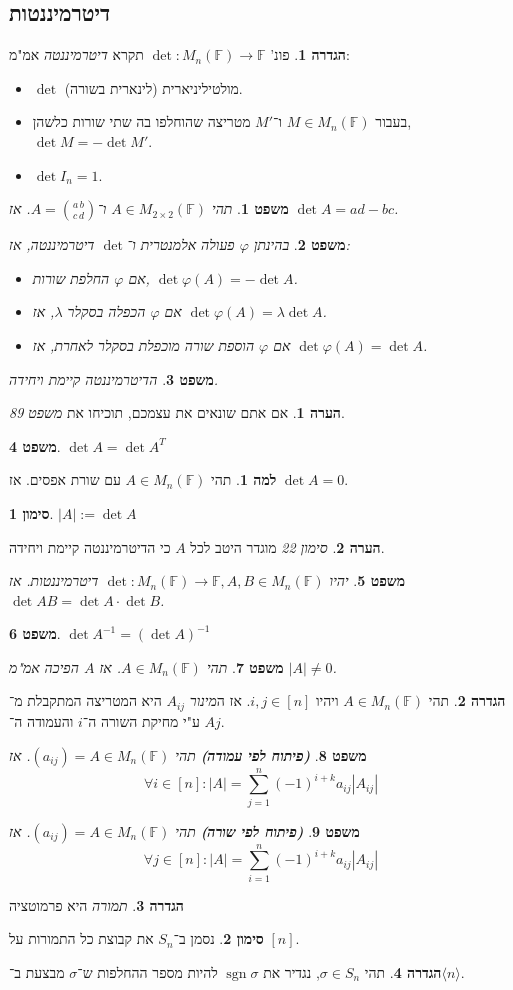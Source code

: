 \documentclass[]{article}
\newcommand\ra    {\rangle}
\newcommand\la    {\langle}
\DeclareMathOperator{\sgn}    {sgn}
\newcommand\F         {\mathbb{F}}
\newcommand\co        {\colon}
\renewcommand\lg      {\lambda}
\newcommand\sg        {\sigma}
\newcommand\op    {^{-1}}
\renewcommand\phi     {\varphi}
\newtheorem{Theorem}{משפט}
\theoremstyle{definition}
\newtheorem{definition}{הגדרה}
\newtheorem{Lemma}{למה}
\newtheorem{Remark}{הערה}
\newtheorem{Notion}{סימון}
\newcommand\theo  [1] {\begin{Theorem}#1\end{Theorem}}
\newcommand\defi  [1] {\begin{definition}#1\end{definition}}
\newcommand\rmark [1] {\begin{Remark}#1\end{Remark}}
\newcommand\lem   [1] {\begin{Lemma}#1\end{Lemma}}
\newcommand\noti  [1] {\begin{Notion}#1\end{Notion}}
\begin{document}
\begin{multicols}{2}
		\section{דיטרמיננטות}
		\defi{פונ' $\det \co M_n(\F) \to \F$ תקרא \textit{דיטרמיננטה} אמ"מ: 
		\begin{itemize}
			\item $\det$ מולטיליניארית (לינארית בשורה). 
			\item בעבור $M \in M_n(\F)$ ו־$M'$ מטריצה שהוחלפו בה שתי שורות כלשהן, $\det M = -\det M'$. 
			\item $\det I_n = 1$. 
		\end{itemize}}
		\theo{תהי $A \in M_{2 \times 2}(\F)$ ו־$A = \binom{a\, b}{c\, d}$. אז $\det A = ad - bc$. }
		\theo{בהינתן $\phi$ פעולה אלמנטרית ו־$\det$ דיטרמיננטה, אז: 
		\begin{itemize}
			\item אם $\phi$ החלפת שורות, $\det \phi (A) = - \det A$. 
			\item אם $\phi$ הכפלה בסקלר $\lg$, אז $\det \phi (A) = \lg \det A$. 
			\item אם $\phi$ הוספת שורה מוכפלת בסקלר לאחרת, אז $\det \phi (A) = \det A$. 
		\end{itemize}}
		\theo{הדיטרמיננטה קיימת ויחידה. }
		\rmark{אם אתם שונאים את עצמכם, תוכיחו את \textit{משפט 89}. }
		\theo{$\det A = \det A^T$}
		\lem{תהי $A \in M_n(\F)$ עם שורת אפסים. אז $\det A = 0$. }
		\noti{\hfil $|A| := \det A$}
		\rmark{\textit{סימון 22} מוגדר היטב לכל $A$ כי הדיטרמיננטה קיימת ויחידה. }
		\theo{יהיו $\det \co M_n(\F) \to \F, A, B \in M_n(\F)$ דיטרמיננטות. אז $\det AB = \det A \cdot \det B$. }
		\theo{\hfil $\det A\op = (\det A)\op$}
		\theo{תהי $A \in M_n(\F)$. אז $A$ הפיכה אמ"מ $|A| \neq 0$. }
		\defi{תהי $A \in M_n(\F)$ ויהיו $i, j \in [n]$. אז ה\textit{מינור} $A_{ij}$ היא המטריצה המתקבלת מ־$A$ ע"י מחיקת השורה ה־$i$ והעמודה ה־$j$. }
		\begin{Theorem}\textbf{\textit{(פיתוח לפי עמודה)}}
			תהי $(a_{ij}) = A \in M_n(\F)$. אז 
			\[ \forall i \in [n] \co |A| = \sum_{j = 1}^{n}(-1)^{i + k}a_{ij} |A_{ij}| \]
		\end{Theorem}
		\begin{Theorem}\textbf{\textit{(פיתוח לפי שורה)}}
			תהי $(a_{ij}) = A \in M_n(\F)$. אז 
			\[ \forall j \in [n] \co |A| = \sum_{i = 1}^{n}(-1)^{i + k}a_{ij} |A_{ij}| \]
		\end{Theorem}
		
		\defi{\textit{תמורה} היא פרמוטציה}
		\noti{נסמן ב־$S_n$ את קבוצת כל התמורות על $[n]$. }
		\defi{תהי $\sg \in S_n$, נגדיר את $\sgn \sg$ להיות מספר ההחלפות ש־$\sg$ מבצעת ב־$\la n \ra$. }
		

\end{multicols}
\end{document}
